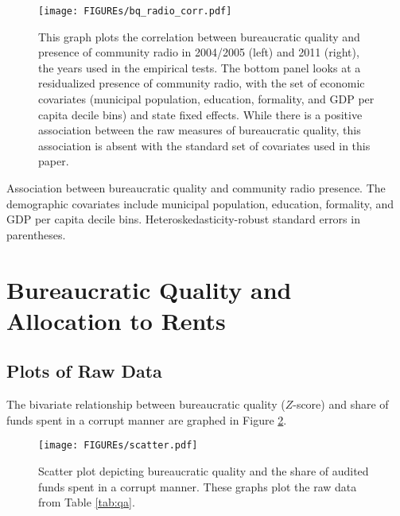 \documentclass[11pt,english]{article}
\begin{document}
\begin{figure}
\texttt{[image: FIGUREs/bq\_radio\_corr.pdf]}
\caption[Association between bureaucratic quality and community radio presence.]{This graph plots the correlation between bureaucratic quality and presence of community radio in 2004/2005 (left) and 2011 (right), the years used in the empirical tests. The bottom panel looks at a residualized presence of community radio, with the set of economic covariates (municipal population, education, formality, and GDP per capita decile bins) and state fixed effects. While there is a positive association between the raw measures of bureaucratic quality, this association is absent with the standard set of covariates used in this paper.}\label{fig:bq_radio}
\end{figure}

\begin{table}
\centering

\caption[Bureaucratic quality and community radio presence.]{Association between bureaucratic quality and community radio presence. The demographic covariates include municipal population, education, formality, and GDP per capita decile bins. Heteroskedasticity-robust standard errors in parentheses.}\label{tab:bq_radio}
\end{table}


\section{Bureaucratic Quality and Allocation to Rents}
\subsection{Plots of Raw Data}
The bivariate relationship between bureaucratic quality ($Z$-score) and share of funds spent in a corrupt manner are graphed in Figure \ref{fig:result1_scatter}.

\begin{figure}[H]
\texttt{[image: FIGUREs/scatter.pdf]}
\caption{Scatter plot depicting bureaucratic quality and the share of audited funds spent in a corrupt manner. These graphs plot the raw data from Table \ref{tab:qa}. }\label{fig:result1_scatter}
\end{figure}
\end{document}
